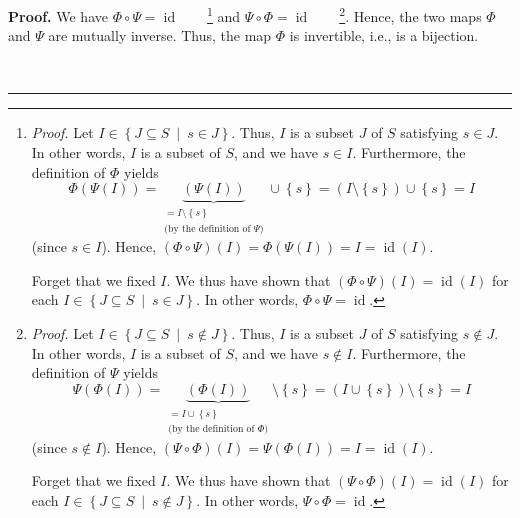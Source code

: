 \documentclass[numbers=enddot,12pt,final,onecolumn,notitlepage]{scrartcl}%
\theoremstyle{definition}
\newenvironment{proof}[1][Proof]{\noindent\textbf{#1.} }{\ \rule{0.5em}{0.5em}}
\newenvironment{verlong}{}{}
\begin{document}
\begin{verlong}
\begin{proof}
We have $\Phi\circ\Psi=\operatorname*{id}$\ \ \ \ \footnote{\textit{Proof.}
Let $I\in\left\{  J\subseteq S\ \mid\ s\in J\right\}  $. Thus, $I$ is a subset
$J$ of $S$ satisfying $s\in J$. In other words, $I$ is a subset of $S$, and we
have $s\in I$. Furthermore, the definition of $\Phi$ yields$\ $
\[
\Phi\left(  \Psi\left(  I\right)  \right)  =\underbrace{\left(  \Psi\left(
I\right)  \right)  }_{\substack{=I\setminus\left\{  s\right\}  \\\text{(by the
definition of }\Psi\text{)}}}\cup\left\{  s\right\}  =\left(  I\setminus
\left\{  s\right\}  \right)  \cup\left\{  s\right\}  =I
\]
(since $s\in I$). Hence, $\left(  \Phi\circ\Psi\right)  \left(  I\right)
=\Phi\left(  \Psi\left(  I\right)  \right)  =I=\operatorname*{id}\left(
I\right)  $.
\par
Forget that we fixed $I$. We thus have shown that $\left(  \Phi\circ
\Psi\right)  \left(  I\right)  =\operatorname*{id}\left(  I\right)  $ for each
$I\in\left\{  J\subseteq S\ \mid\ s\in J\right\}  $. In other words,
$\Phi\circ\Psi=\operatorname*{id}$.} and $\Psi\circ\Phi=\operatorname*{id}%
$\ \ \ \ \footnote{\textit{Proof.} Let $I\in\left\{  J\subseteq S\ \mid
\ s\notin J\right\}  $. Thus, $I$ is a subset $J$ of $S$ satisfying $s\notin
J$. In other words, $I$ is a subset of $S$, and we have $s\notin I$.
Furthermore, the definition of $\Psi$ yields$\ $
\[
\Psi\left(  \Phi\left(  I\right)  \right)  =\underbrace{\left(  \Phi\left(
I\right)  \right)  }_{\substack{=I\cup\left\{  s\right\}  \\\text{(by the
definition of }\Phi\text{)}}}\setminus\left\{  s\right\}  =\left(
I\cup\left\{  s\right\}  \right)  \setminus\left\{  s\right\}  =I
\]
(since $s\notin I$). Hence, $\left(  \Psi\circ\Phi\right)  \left(  I\right)
=\Psi\left(  \Phi\left(  I\right)  \right)  =I=\operatorname*{id}\left(
I\right)  $.
\par
Forget that we fixed $I$. We thus have shown that $\left(  \Psi\circ
\Phi\right)  \left(  I\right)  =\operatorname*{id}\left(  I\right)  $ for each
$I\in\left\{  J\subseteq S\ \mid\ s\notin J\right\}  $. In other words,
$\Psi\circ\Phi=\operatorname*{id}$.}. Hence, the two maps $\Phi$ and $\Psi$
are mutually inverse. Thus, the map $\Phi$ is invertible, i.e., is a bijection.


\end{proof}
\end{verlong}
\end{document}
